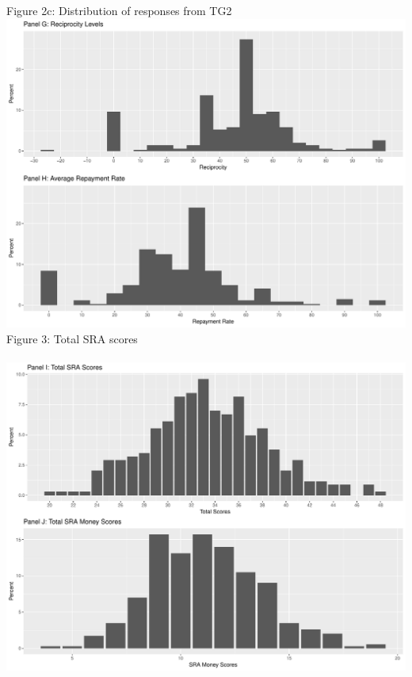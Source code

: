 \documentclass[12pt]{article}
\begin{document}
\noindent Figure 2c: Distribution of responses from TG2 \\
\includegraphics[scale=0.4]{Figure2c.pdf} \\



\noindent Figure 3: Total SRA scores\\ \\
\includegraphics[scale=0.35]{Figure3.pdf}\\
\end{document}

